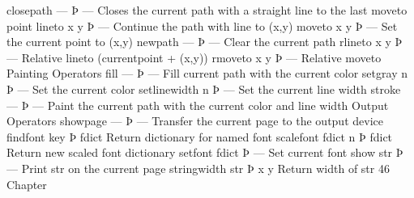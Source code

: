 closepath — Þ —
Closes the current path with a straight line to the last moveto point
lineto x y Þ —
Continue the path with line to (x,y)
moveto x y Þ —
Set the current point to (x,y)
newpath — Þ —
Clear the current path
rlineto x y Þ —
Relative lineto (currentpoint + (x,y))
rmoveto x y Þ —
Relative moveto
Painting Operators
fill — Þ —
Fill current path with the current color
setgray n Þ —
Set the current color
setlinewidth n Þ —
Set the current line width
stroke — Þ —
Paint the current path with the current color and line width
Output Operators
showpage — Þ —
Transfer the current page to the output device
findfont key Þ fdict
Return dictionary for named font
scalefont fdict n Þ fdict
Return new scaled font dictionary
setfont fdict Þ —
Set current font
show str Þ —
Print str on the current page
stringwidth str Þ x y
Return width of str
46 Chapter

